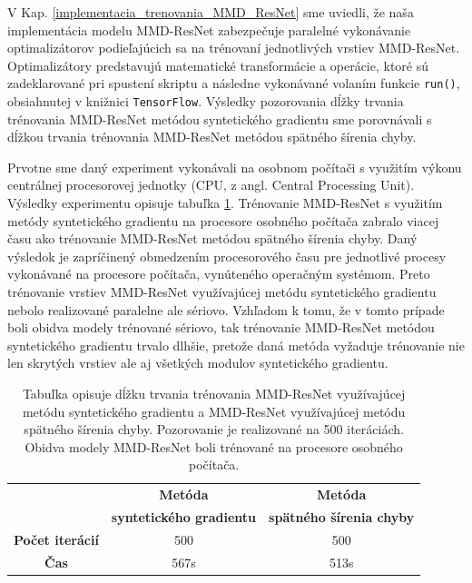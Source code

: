 V Kap. \ref{implementacia_trenovania_MMD_ResNet} sme uviedli, že naša implementácia modelu MMD-ResNet zabezpečuje paralelné vykonávanie optimalizátorov podieľajúcich sa na trénovaní jednotlivých vrstiev MMD-ResNet. Optimalizátory predstavujú matematické transformácie a operácie, ktoré sú zadeklarované pri spustení skriptu a následne vykonávané volaním funkcie \texttt{run()}, obsiahnutej v knižnici \texttt{TensorFlow}. Výsledky pozorovania dĺžky trvania trénovania MMD-ResNet metódou syntetického gradientu sme porovnávali s dĺžkou trvania trénovania MMD-ResNet metódou spätného šírenia chyby. 

Prvotne sme daný experiment vykonávali na osobnom počítači s využitím výkonu centrálnej procesorovej jednotky (CPU, z angl. Central Processing Unit). Výsledky experimentu opisuje tabuľka \ref{vysledok2}. Trénovanie MMD-ResNet s využitím metódy syntetického gradientu na procesore osobného počítača zabralo viacej času ako trénovanie MMD-ResNet metódou spätného šírenia chyby. Daný výsledok je zapríčinený obmedzením procesorového času pre jednotlivé procesy vykonávané na procesore počítača, vynúteného operačným systémom. Preto trénovanie vrstiev MMD-ResNet využívajúcej metódu syntetického gradientu nebolo realizované paralelne ale sériovo. Vzhľadom k tomu, že v tomto prípade boli obidva modely trénované sériovo, tak trénovanie MMD-ResNet metódou syntetického gradientu trvalo dlhšie, pretože daná metóda vyžaduje trénovanie nie len skrytých vrstiev ale aj všetkých modulov syntetického gradientu.

\begin{table}
\caption[Trénovanie MMD-ResNet na procesore počítača]{Tabuľka opisuje dĺžku trvania trénovania MMD-ResNet využívajúcej metódu syntetického gradientu a MMD-ResNet využívajúcej metódu spätného šírenia chyby. Pozorovanie je realizované na 500 iteráciách. Obidva modely MMD-ResNet boli trénované na procesore osobného počítača.}
\label{vysledok2}
\begin{center}
\begin{tabular}{|c|c|c|}
\hline
  & \textbf{Metóda} & \textbf{Metóda} \\
  & \textbf{syntetického gradientu} & \textbf{spätného šírenia chyby} \\
\hline
\textbf{Počet iterácií} & 500 & 500 \\
\hline
\textbf{Čas} & 567s & 513s \\
\hline
\end{tabular}%
\end{center}
\end{table}

